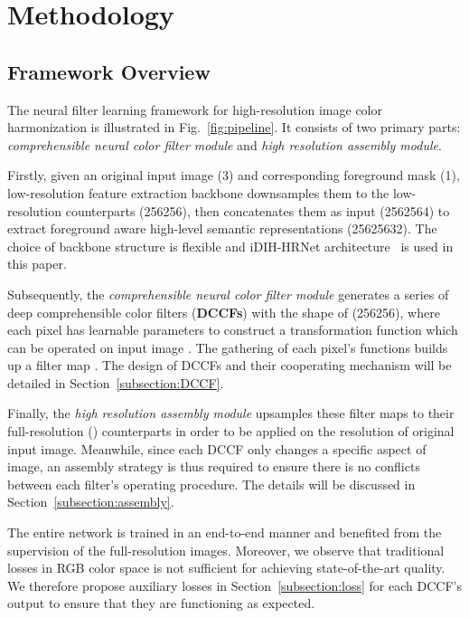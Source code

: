 \documentclass[runningheads]{llncs}
\begin{document}
    
    
    \section{Methodology}
    
    \subsection{Framework Overview}
    
    
    
    The neural filter learning framework for high-resolution image color harmonization is illustrated in Fig.~\ref{fig:pipeline}.
It consists of two primary parts: \textit{comprehensible neural color filter module} and \textit{high resolution assembly module}.
    
    Firstly, given an original input image (3) and corresponding foreground mask (1), low-resolution feature extraction backbone downsamples them to the low-resolution counterparts (256256), then concatenates them as input (2562564) to extract foreground aware high-level semantic representations (25625632).
    The choice of backbone structure is flexible and iDIH-HRNet architecture~\cite{sofiiuk2021foreground} is used in this paper.


Subsequently, the \textit{comprehensible neural color filter module} generates a series of deep comprehensible color filters (\textbf{DCCFs}) with the shape of (256256), where each pixel has  learnable parameters  to construct a transformation function  which can be operated on input image . 
    The gathering of each pixel's functions  builds up a filter map .
    The design of DCCFs and their cooperating mechanism will be detailed in Section~\ref{subsection:DCCF}.
    
Finally, the \textit{high resolution assembly module} upsamples these filter maps to their full-resolution () counterparts in order to be applied on the resolution of original input image. 
    Meanwhile, since each DCCF only changes a specific aspect of image, an assembly strategy is thus required to ensure there is no conflicts between each filter's operating procedure.
    The details will be discussed in Section~\ref{subsection:assembly}.
    
    


The entire network is trained in an end-to-end manner and benefited from the supervision of the full-resolution images.
Moreover, we observe that traditional losses in RGB color space is not sufficient for achieving state-of-the-art quality.
We therefore propose auxiliary losses in Section~\ref{subsection:loss} for each DCCF's output to ensure that they are functioning as expected.
    
\end{document}
